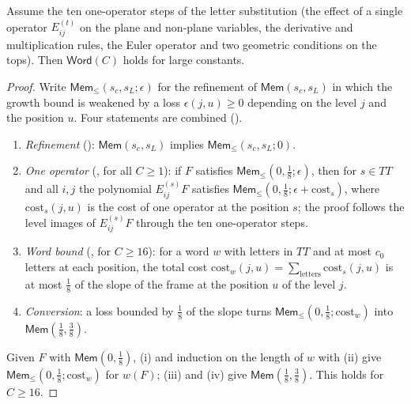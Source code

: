\begin{proposition}\label{pf:linkG:word}
Assume the ten one-operator steps of the letter substitution (the effect of a single operator $E^{(t)}_{ij}$ on the plane
and non-plane variables, the derivative and multiplication rules, the Euler operator and two geometric conditions on the
tops). Then $\mathsf{Word}(C)$ holds for large constants.
\end{proposition}

\begin{proof}
Write $\mathsf{Mem}_\le(s_c,s_L;\epsilon)$ for the refinement of $\mathsf{Mem}(s_c,s_L)$ in which the growth bound is weakened by a
loss $\epsilon(j,u)\ge0$ depending on the level $j$ and the position $u$. Four statements are combined
().
\begin{enumerate}[label=(\roman*)]
\item \emph{Refinement} (): $\mathsf{Mem}(s_c,s_L)$ implies
$\mathsf{Mem}_\le(s_c,s_L;0)$.
\item \emph{One operator} (, for all $C\ge1$): if $F$ satisfies
$\mathsf{Mem}_\le(0,\frac18;\epsilon)$, then for $s\in TT$ and all $i,j$ the polynomial $E^{(s)}_{ij}F$ satisfies
$\mathsf{Mem}_\le(0,\frac18;\epsilon+\mathrm{cost}_s)$, where $\mathrm{cost}_s(j,u)$ is the cost of one operator at the position $s$;
the proof follows the level images of $E^{(s)}_{ij}F$ through the ten one-operator steps.
\item \emph{Word bound} (, for $C\ge16$): for a word $w$ with
letters in $TT$ and at most $c_0$ letters at each position, the total cost $\mathrm{cost}_w(j,u)=\sum_{\text{letters}}
\mathrm{cost}_s(j,u)$ is at most $\frac18$ of the slope of the frame at the position $u$ of the level $j$.
\item \emph{Conversion}: a loss bounded by $\frac18$ of the slope turns $\mathsf{Mem}_\le(0,\frac18;\mathrm{cost}_w)$ into
$\mathsf{Mem}(\frac18,\frac38)$.
\end{enumerate}
Given $F$ with $\mathsf{Mem}(0,\frac18)$, (i) and induction on the length of $w$ with (ii) give
$\mathsf{Mem}_\le(0,\frac18;\mathrm{cost}_w)$ for $w(F)$; (iii) and (iv) give $\mathsf{Mem}(\frac18,\frac38)$. This holds for
$C\ge16$.
\end{proof}

